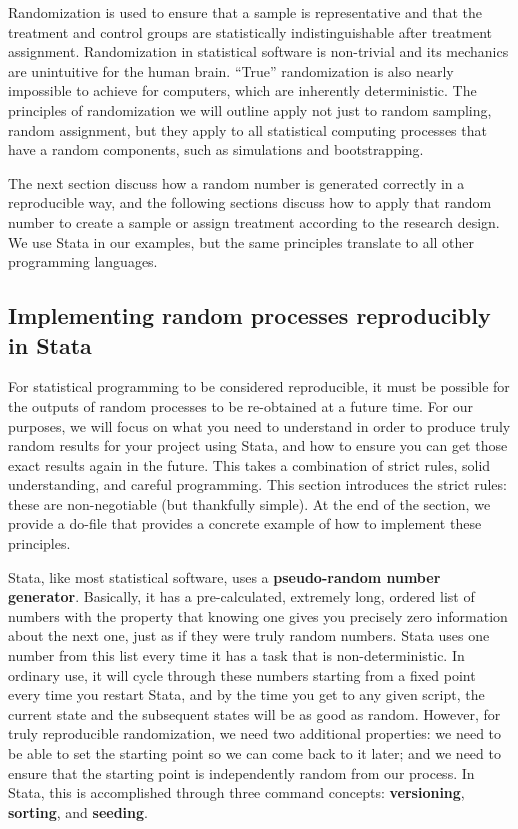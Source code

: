 Randomization is used to ensure that a sample is representative and
that the treatment and control groups are statistically indistinguishable
after treatment assignment.
Randomization in statistical software is non-trivial
and its mechanics are unintuitive for the human brain.
``True'' randomization is also nearly impossible to achieve for computers,
which are inherently deterministic.
The principles of randomization we will outline
apply not just to random sampling, random assignment,
but they apply to all statistical computing processes that have a random components,
such as simulations and bootstrapping.

The next section discuss how a random number
is generated correctly in a reproducible way,
and the following sections discuss how to
apply that random number to create a sample or assign treatment
according to the research design.
We use Stata in our examples,
but the same principles translate to all other programming languages.

\subsection{Implementing random processes reproducibly in Stata}

For statistical programming to be considered reproducible,
it must be possible for the outputs of random processes
to be re-obtained at a future time.\cite{orozco2018make}
For our purposes, we will focus on what you need to understand
in order to produce truly random results for your project using Stata,
and how to ensure you can get those exact results again in the future.
This takes a combination of strict rules, solid understanding, and careful programming.
This section introduces the strict rules:
these are non-negotiable (but thankfully simple).
At the end of the section,
we provide a do-file that provides a concrete example
of how to implement these principles.

Stata, like most statistical software, uses a \textbf{pseudo-random number generator}.
Basically, it has a pre-calculated, extremely long, ordered list
of numbers with the property that
knowing one gives you precisely zero information about the next one,
just as if they were truly random numbers.
Stata uses one number from this list every time it has a task that is non-deterministic.
In ordinary use, it will cycle through these numbers starting from a fixed point
every time you restart Stata, and by the time you get to any given script,
the current state and the subsequent states will be as good as random.
However, for truly reproducible randomization, we need two additional properties:
we need to be able to set the starting point so we can come back to it later;
and we need to ensure that the starting point is independently random from our process.
In Stata, this is accomplished through three command concepts:
\textbf{versioning}, \textbf{sorting}, and \textbf{seeding}.

